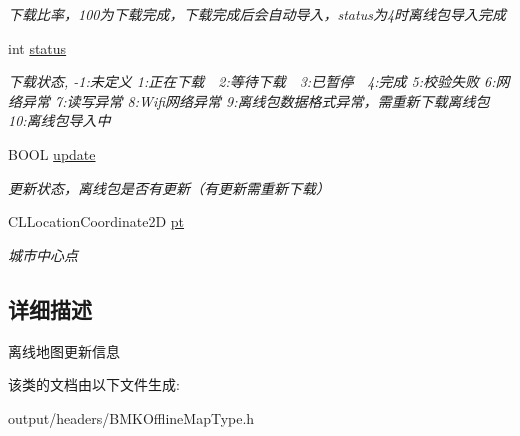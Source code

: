 \begin{DoxyCompactItemize}
\begin{DoxyCompactList}\small\item\em 下载比率，100为下载完成，下载完成后会自动导入，status为4时离线包导入完成 \end{DoxyCompactList}\item 
\hypertarget{interface_b_m_k_o_l_update_element_a1e980d13929fc0dc732edddf1ae13bf2}{}int \hyperlink{interface_b_m_k_o_l_update_element_a1e980d13929fc0dc732edddf1ae13bf2}{status}\label{interface_b_m_k_o_l_update_element_a1e980d13929fc0dc732edddf1ae13bf2}

\begin{DoxyCompactList}\small\item\em 下载状态, -\/1\+:未定义 1\+:正在下载　2\+:等待下载　3\+:已暂停　4\+:完成 5\+:校验失败 6\+:网络异常 7\+:读写异常 8\+:Wifi网络异常 9\+:离线包数据格式异常，需重新下载离线包 10\+:离线包导入中 \end{DoxyCompactList}\item 
\hypertarget{interface_b_m_k_o_l_update_element_a1adc137eba11d9ae142310d3556bc446}{}B\+O\+O\+L \hyperlink{interface_b_m_k_o_l_update_element_a1adc137eba11d9ae142310d3556bc446}{update}\label{interface_b_m_k_o_l_update_element_a1adc137eba11d9ae142310d3556bc446}

\begin{DoxyCompactList}\small\item\em 更新状态，离线包是否有更新（有更新需重新下载） \end{DoxyCompactList}\item 
\hypertarget{interface_b_m_k_o_l_update_element_a9e229b507ced476146db8f80c71ea5bd}{}C\+L\+Location\+Coordinate2\+D \hyperlink{interface_b_m_k_o_l_update_element_a9e229b507ced476146db8f80c71ea5bd}{pt}\label{interface_b_m_k_o_l_update_element_a9e229b507ced476146db8f80c71ea5bd}

\begin{DoxyCompactList}\small\item\em 城市中心点 \end{DoxyCompactList}\end{DoxyCompactItemize}


\subsection{详细描述}
离线地图更新信息 

该类的文档由以下文件生成\+:\begin{DoxyCompactItemize}
\item 
output/headers/B\+M\+K\+Offline\+Map\+Type.\+h\end{DoxyCompactItemize}
